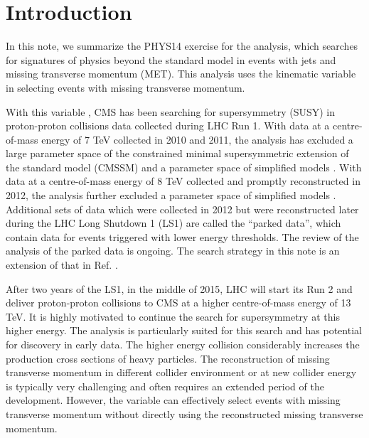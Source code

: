 \section{Introduction}
\label{sec:intro}


In this note, we summarize the PHYS14 exercise \cite{PHYS14} for the
\alphat analysis, which searches for signatures of physics beyond the
standard model in events with jets and missing transverse momentum
(MET). This analysis uses the kinematic variable \alphat in selecting
events with missing transverse momentum.



With this variable \alphat, CMS has been searching for supersymmetry
(SUSY) in proton-proton collisions data collected during LHC Run 1. With
data at a centre-of-mass energy of 7 TeV collected in 2010 and 2011, the
\alphat analysis has excluded a large parameter space of the constrained
minimal supersymmetric extension of the standard model (CMSSM)
\cite{Khachatryan:2011tk, Chatrchyan:2011zy, Chatrchyan:2012wa} and a
parameter space of simplified models \cite{Chatrchyan:2012wa}. With data
at a centre-of-mass energy of 8 TeV collected and promptly reconstructed
in 2012, the \alphat analysis further excluded a parameter space of
simplified models \cite{Chatrchyan:2013lya}. Additional sets of data
which were collected in 2012 but were reconstructed later during the LHC
Long Shutdown 1 (LS1) are called the ``parked data'', which contain data
for events triggered with lower energy thresholds. The review of the
\alphat analysis of the parked data \cite{CMS_AN_2013-366} is ongoing.
The search strategy in this note is an extension of that in Ref.
\cite{CMS_AN_2013-366}.

After two years of the LS1, in the middle of 2015, LHC will start its
Run 2 and deliver proton-proton collisions to CMS at a higher
centre-of-mass energy of 13 TeV. It is highly motivated to continue the
search for supersymmetry at this higher energy. The \alphat analysis is
particularly suited for this search and has potential for discovery in
early data. The higher energy collision considerably increases the
production cross sections of heavy particles. The reconstruction of
missing transverse momentum in different collider environment or at new
collider energy is typically very challenging and often requires an
extended period of the development. However, the variable \alphat can
effectively select events with missing transverse momentum without
directly using the reconstructed missing transverse momentum.

